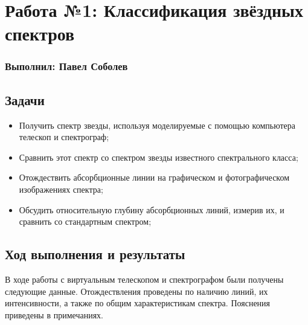 

\usepackage[lmargin=28mm]{geometry}
\usepackage{makecell}



\section*{Работа №1: Классификация звёздных спектров}
\subsubsection*{Выполнил: Павел Соболев}

\vspace{3em}

\subsection*{Задачи}

\begin{itemize}
  \setlength\itemsep{-0.1em}
  \item Получить спектр звезды, используя моделируемые с помощью компьютера телескоп и спектрограф;
  \item Сравнить этот спектр со спектром звезды известного спектрального класса;
  \item Отождествить абсорбционные линии на графическом и фотографическом изображениях спектра;
  \item Обсудить относительную глубину абсорбционных линий, измерив их, и сравнить со стандартным спектром;
\end{itemize}

\subsection*{Ход выполнения и результаты}

В ходе работы с виртуальным телескопом и спектрографом были получены следующие данные.
Отождествления проведены по наличию линий, их интенсивности, а также по общим характеристикам спектра.
Пояснения приведены в примечаниях.


